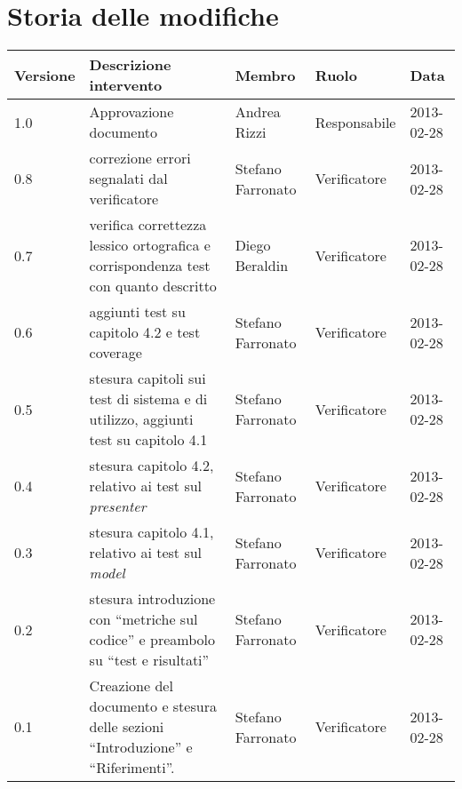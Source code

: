 

\section*{Storia delle modifiche}
\begin{center}
\begin{longtable}{lp{}lll}
\toprule
Versione & Descrizione intervento & Membro & Ruolo & Data\\
\midrule %
1.0 & Approvazione documento& Andrea Rizzi & Responsabile & 2013-02-28\\
0.8 & correzione errori segnalati dal verificatore& Stefano Farronato & Verificatore & 2013-02-28\\
0.7 & verifica correttezza lessico ortografica e corrispondenza test con quanto descritto& Diego Beraldin & Verificatore & 2013-02-28\\
0.6 & aggiunti test su capitolo 4.2 e test coverage& Stefano Farronato & Verificatore & 2013-02-28\\
0.5 & stesura capitoli sui test di sistema e di utilizzo, aggiunti test su capitolo 4.1& Stefano Farronato & Verificatore & 2013-02-28\\
0.4 & stesura capitolo 4.2, relativo ai test sul \textit{presenter} & Stefano Farronato & Verificatore & 2013-02-28\\
0.3 & stesura capitolo 4.1, relativo ai test sul \textit{model} & Stefano Farronato & Verificatore & 2013-02-28\\
0.2 & stesura introduzione con ``metriche sul codice'' e preambolo su ``test e risultati''& Stefano Farronato & Verificatore & 2013-02-28\\
0.1 & Creazione del documento e stesura delle sezioni ``Introduzione'' e ``Riferimenti''. & Stefano Farronato & Verificatore & 2013-02-28\\
\bottomrule
\end{longtable}
\end{center}
\newpage



